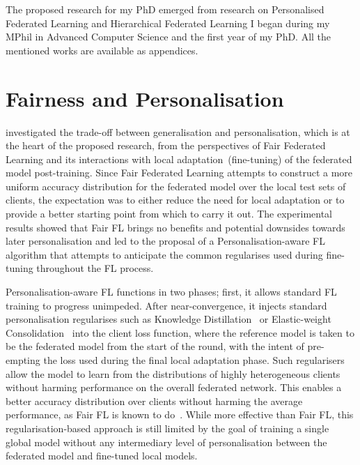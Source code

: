 The proposed research for my PhD emerged from research on Personalised Federated Learning and Hierarchical Federated Learning I began during my MPhil in Advanced Computer Science and the first year of my PhD. All the mentioned works are available as appendices.

\section{Fairness and Personalisation}

\citet{EuroMLSysWorkshop} investigated the trade-off between generalisation and personalisation, which is at the heart of the proposed research, from the perspectives of Fair Federated Learning and its interactions with local adaptation~(fine-tuning) of the federated model post-training. Since Fair Federated Learning attempts to construct a more uniform accuracy distribution for the federated model over the local test sets of clients, the expectation was to either reduce the need for local adaptation or to provide a better starting point from which to carry it out. The experimental results showed that Fair FL brings no benefits and potential downsides towards later personalisation and led to the proposal of a Personalisation-aware FL algorithm that attempts to anticipate the common regularises used during fine-tuning throughout the FL process.

Personalisation-aware FL functions in two phases; first, it allows standard FL training to progress unimpeded. After near-convergence, it injects standard personalisation regularises such as Knowledge Distillation~\citep{DistillingKnowledgeInNeuralNetworks,DeepMutualLearning} or Elastic-weight Consolidation~\citep{EWC} into the client loss function, where the reference model is taken to be the federated model from the start of the round, with the intent of pre-empting the loss used during the final local adaptation phase. Such regularisers allow the model to learn from the distributions of highly heterogeneous clients without harming performance on the overall federated network. This enables a better accuracy distribution over clients without harming the average performance, as Fair FL is known to do~\citep{QFedAvg,TERM}. While more effective than Fair FL, this regularisation-based approach is still limited by the goal of training a single global model without any intermediary level of personalisation between the federated model and fine-tuned local models.

